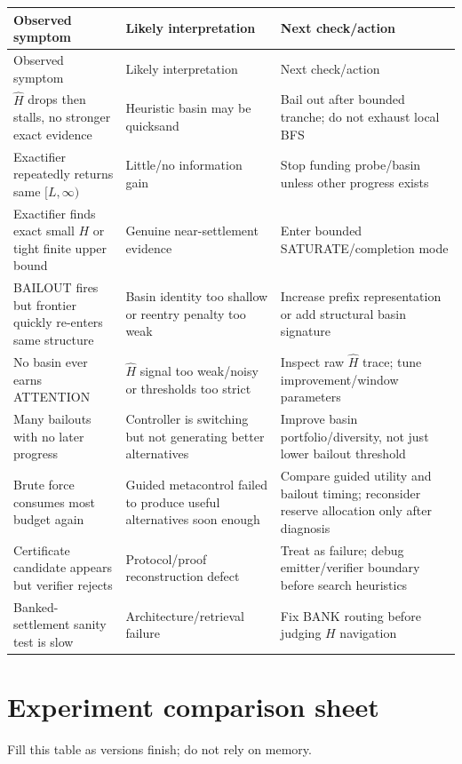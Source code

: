 \documentclass[11pt]{article}
\begin{document}
\begin{longtable}{p{}p{}p{}}
\toprule
Observed symptom & Likely interpretation & Next check/action \\
\midrule
\endfirsthead
\toprule
Observed symptom & Likely interpretation & Next check/action \\
\midrule
\endhead
$\widehat H$ drops then stalls, no stronger exact evidence & Heuristic basin may be quicksand & Bail out after bounded tranche; do not exhaust local BFS \\
Exactifier repeatedly returns same $[L,\infty)$ & Little/no information gain & Stop funding probe/basin unless other progress exists \\
Exactifier finds exact small $H$ or tight finite upper bound & Genuine near-settlement evidence & Enter bounded SATURATE/completion mode \\
BAILOUT fires but frontier quickly re-enters same structure & Basin identity too shallow or reentry penalty too weak & Increase prefix representation or add structural basin signature \\
No basin ever earns ATTENTION & $\widehat H$ signal too weak/noisy or thresholds too strict & Inspect raw $\widehat H$ trace; tune improvement/window parameters \\
Many bailouts with no later progress & Controller is switching but not generating better alternatives & Improve basin portfolio/diversity, not just lower bailout threshold \\
Brute force consumes most budget again & Guided metacontrol failed to produce useful alternatives soon enough & Compare guided utility and bailout timing; reconsider reserve allocation only after diagnosis \\
Certificate candidate appears but verifier rejects & Protocol/proof reconstruction defect & Treat as failure; debug emitter/verifier boundary before search heuristics \\
Banked-settlement sanity test is slow & Architecture/retrieval failure & Fix BANK routing before judging $H$ navigation \\
\bottomrule
\end{longtable}

\section{Experiment comparison sheet}

Fill this table as versions finish; do not rely on memory.
\end{document}
